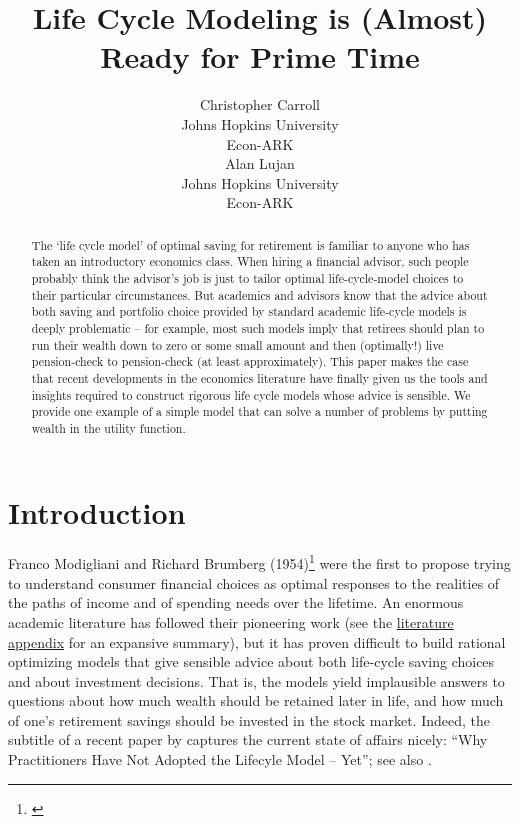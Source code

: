 \documentclass{article}
\title{Life Cycle Modeling is (Almost) \\ Ready for Prime Time}
\date{\displaydate{articleDate}}
\author{Christopher Carroll\footnotemark[1]\\
Johns Hopkins University\\Econ-ARK\\\AND
Alan Lujan\\
Johns Hopkins University\\Econ-ARK\\}
\begin{document}
\maketitle
{}

\begin{abstract}
The `life cycle model' of optimal saving for retirement is familiar to anyone who has taken an introductory economics class.
When hiring a financial advisor, such people probably think the advisor's job is just to tailor optimal life-cycle-model choices to their particular circumstances.
But academics and advisors know that the advice about both saving and portfolio choice provided by standard academic life-cycle models is deeply problematic -- for example, most such models imply that retirees should plan to run their wealth down to zero or some small amount and then (optimally!) live pension-check to pension-check (at least approximately).
This paper makes the case that recent developments in the economics literature have finally given us the tools and insights required to construct rigorous life cycle models whose advice is sensible.
We provide one example of a simple model that can solve a number of problems by putting wealth in the utility function.
\end{abstract}

\keywords{}


\section{Introduction}

Franco Modigliani and Richard Brumberg (1954)\footnote{\cite{2005}} were the first to propose trying to understand consumer financial choices as optimal responses to the realities of the paths of income and of spending needs over the lifetime.
An enormous academic literature has followed their pioneering work (see the \href{\#lit-review}{literature appendix} for an expansive summary),
but it has proven difficult to build rational optimizing models that give sensible advice about both life-cycle saving choices and about investment decisions.
That is, the models yield implausible answers to questions about how much wealth should be retained later in life, and how much of one's retirement savings should be invested in the stock market.
Indeed, the subtitle of a recent paper by \cite{Daga_2023} captures the current state of affairs nicely: ``Why Practitioners Have Not Adopted the Lifecyle Model -- Yet''; see also \cite{DeNardi2016d}.
\end{document}
